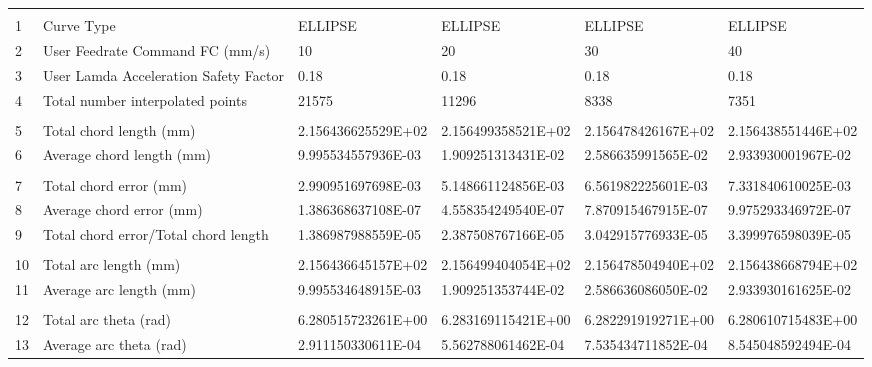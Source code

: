 

\begin{tabular}{ p{0.5cm} p{8.0cm} p{4.00cm} p{4.0cm} p{4.00cm} p{4.0cm}}
\hline
	&                                                      &                    &                      &                    & \\
1	& Curve Type	                                       & ELLIPSE            & ELLIPSE	           & ELLIPSE            &	ELLIPSE \\
2	& User Feedrate Command FC (mm/s)                      &	10	            &    20                &	30	            &    40 \\
3	& User Lamda Acceleration Safety Factor	               &   0.18             &	0.18               &   0.18             &   0.18 \\
4	& Total number interpolated points	                   &   21575	        &  11296	           &  8338	            &   7351 \\
	&                                                      &                    &                      &                    & \\
5	& Total chord length (mm)	                           & 2.156436625529E+02	& 2.156499358521E+02   & 2.156478426167E+02	& 2.156438551446E+02 \\
6	& Average chord length (mm)	                           & 9.995534557936E-03	& 1.909251313431E-02   & 2.586635991565E-02	& 2.933930001967E-02 \\
	&                                                      &                    &                      &                    & \\
7	& Total chord error (mm)	                           & 2.990951697698E-03	& 5.148661124856E-03   & 6.561982225601E-03	& 7.331840610025E-03 \\
8	& Average chord error (mm)	                           & 1.386368637108E-07	& 4.558354249540E-07   & 7.870915467915E-07	& 9.975293346972E-07 \\
9	& Total chord error/Total chord length                 & 1.386987988559E-05	& 2.387508767166E-05   & 3.042915776933E-05	& 3.399976598039E-05 \\
	&                                                      &                    &                      &                    & \\
10	& Total arc length (mm)	                               & 2.156436645157E+02	& 2.156499404054E+02   & 2.156478504940E+02	& 2.156438668794E+02 \\
11	& Average arc length (mm)	                           & 9.995534648915E-03	& 1.909251353744E-02   & 2.586636086050E-02	& 2.933930161625E-02 \\
	&                                                      &                    &                      &                    & \\
12	& Total arc theta (rad)	                               & 6.280515723261E+00	& 6.283169115421E+00   & 6.282291919271E+00	& 6.280610715483E+00 \\
13	& Average arc theta (rad)	                           & 2.911150330611E-04	& 5.562788061462E-04   & 7.535434711852E-04	& 8.545048592494E-04 \\


\end{tabular}
